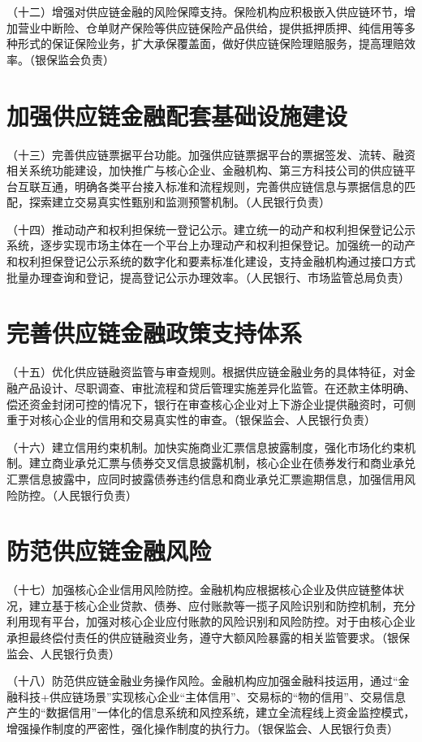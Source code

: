 （十二）增强对供应链金融的风险保障支持。保险机构应积极嵌入供应链环节，增加营业中断险、仓单财产保险等供应链保险产品供给，提供抵押质押、纯信用等多种形式的保证保险业务，扩大承保覆盖面，做好供应链保险理赔服务，提高理赔效率。（银保监会负责）

\section{加强供应链金融配套基础设施建设}

（十三）完善供应链票据平台功能。加强供应链票据平台的票据签发、流转、融资相关系统功能建设，加快推广与核心企业、金融机构、第三方科技公司的供应链平台互联互通，明确各类平台接入标准和流程规则，完善供应链信息与票据信息的匹配，探索建立交易真实性甄别和监测预警机制。（人民银行负责）

（十四）推动动产和权利担保统一登记公示。建立统一的动产和权利担保登记公示系统，逐步实现市场主体在一个平台上办理动产和权利担保登记。加强统一的动产和权利担保登记公示系统的数字化和要素标准化建设，支持金融机构通过接口方式批量办理查询和登记，提高登记公示办理效率。（人民银行、市场监管总局负责）

\section{完善供应链金融政策支持体系}

（十五）优化供应链融资监管与审查规则。根据供应链金融业务的具体特征，对金融产品设计、尽职调查、审批流程和贷后管理实施差异化监管。在还款主体明确、偿还资金封闭可控的情况下，银行在审查核心企业对上下游企业提供融资时，可侧重于对核心企业的信用和交易真实性的审查。（银保监会、人民银行负责）

（十六）建立信用约束机制。加快实施商业汇票信息披露制度，强化市场化约束机制。建立商业承兑汇票与债券交叉信息披露机制，核心企业在债券发行和商业承兑汇票信息披露中，应同时披露债券违约信息和商业承兑汇票逾期信息，加强信用风险防控。（人民银行负责）

\section{防范供应链金融风险}

（十七）加强核心企业信用风险防控。金融机构应根据核心企业及供应链整体状况，建立基于核心企业贷款、债券、应付账款等一揽子风险识别和防控机制，充分利用现有平台，加强对核心企业应付账款的风险识别和风险防控。对于由核心企业承担最终偿付责任的供应链融资业务，遵守大额风险暴露的相关监管要求。（银保监会、人民银行负责）

（十八）防范供应链金融业务操作风险。金融机构应加强金融科技运用，通过“金融科技+供应链场景”实现核心企业“主体信用”、交易标的“物的信用”、交易信息产生的“数据信用”一体化的信息系统和风控系统，建立全流程线上资金监控模式，增强操作制度的严密性，强化操作制度的执行力。（银保监会、人民银行负责）

